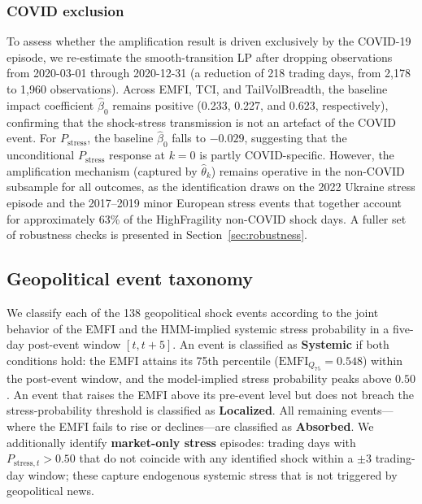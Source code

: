 \documentclass[11pt]{article}
\begin{document}
\subsubsection{COVID exclusion}
\label{sec:covid_excl}

To assess whether the amplification result is driven exclusively by the
COVID-19 episode, we re-estimate the smooth-transition LP after dropping
observations from 2020-03-01 through 2020-12-31 (a reduction of 218
trading days, from 2,178 to 1,960 observations). Across EMFI, TCI, and
TailVolBreadth, the baseline impact coefficient $\hat\beta_0$ remains
positive (0.233, 0.227, and 0.623, respectively), confirming that the
shock-stress transmission is not an artefact of the COVID event. For
$P_{\text{stress}}$, the baseline $\hat\beta_0$ falls to $-0.029$,
suggesting that the unconditional $P_{\text{stress}}$ response at $k=0$
is partly COVID-specific. However, the amplification mechanism (captured
by $\hat\theta_k$) remains operative in the non-COVID subsample for all
outcomes, as the identification draws on the 2022 Ukraine stress episode
and the 2017--2019 minor European stress events that together account for
approximately 63\% of the HighFragility non-COVID shock days. A fuller
set of robustness checks is presented in Section~\ref{sec:robustness}.

\subsection{Geopolitical event taxonomy}
\label{sec:taxonomy}

We classify each of the 138 geopolitical shock events according to the joint behavior of the EMFI and the HMM-implied systemic stress probability in a five-day post-event window $[t, t+5]$.
An event is classified as \textbf{Systemic} if both conditions hold: the EMFI attains its 75th percentile ($\text{EMFI}_{Q_{75}} = 0.548$) within the post-event window, and the model-implied stress probability peaks above $0.50$.
An event that raises the EMFI above its pre-event level but does not breach the stress-probability threshold is classified as \textbf{Localized}.
All remaining events---where the EMFI fails to rise or declines---are classified as \textbf{Absorbed}.
We additionally identify \textbf{market-only stress} episodes: trading days with $P_{\text{stress},t} > 0.50$ that do not coincide with any identified shock within a $\pm 3$ trading-day window; these capture endogenous systemic stress that is not triggered by geopolitical news.
\end{document}
